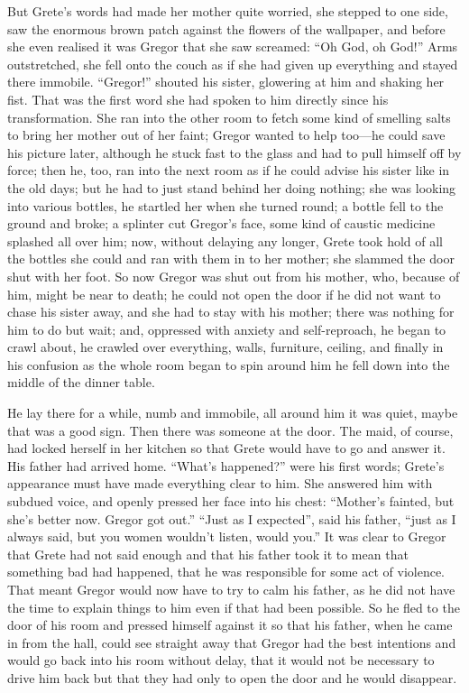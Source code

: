 But Grete’s words had made her mother quite worried, she stepped to one
side, saw the enormous brown patch against the flowers of the
wallpaper, and before she even realised it was Gregor that she saw
screamed: “Oh God, oh God!” Arms outstretched, she fell onto the couch
as if she had given up everything and stayed there immobile. “Gregor!”
shouted his sister, glowering at him and shaking her fist. That was the
first word she had spoken to him directly since his transformation. She
ran into the other room to fetch some kind of smelling salts to bring
her mother out of her faint; Gregor wanted to help too—he could save
his picture later, although he stuck fast to the glass and had to pull
himself off by force; then he, too, ran into the next room as if he
could advise his sister like in the old days; but he had to just stand
behind her doing nothing; she was looking into various bottles, he
startled her when she turned round; a bottle fell to the ground and
broke; a splinter cut Gregor’s face, some kind of caustic medicine
splashed all over him; now, without delaying any longer, Grete took
hold of all the bottles she could and ran with them in to her mother;
she slammed the door shut with her foot. So now Gregor was shut out
from his mother, who, because of him, might be near to death; he could
not open the door if he did not want to chase his sister away, and she
had to stay with his mother; there was nothing for him to do but wait;
and, oppressed with anxiety and self-reproach, he began to crawl about,
he crawled over everything, walls, furniture, ceiling, and finally in
his confusion as the whole room began to spin around him he fell down
into the middle of the dinner table.

He lay there for a while, numb and immobile, all around him it was
quiet, maybe that was a good sign. Then there was someone at the door.
The maid, of course, had locked herself in her kitchen so that Grete
would have to go and answer it. His father had arrived home. “What’s
happened?” were his first words; Grete’s appearance must have made
everything clear to him. She answered him with subdued voice, and
openly pressed her face into his chest: “Mother’s fainted, but she’s
better now. Gregor got out.” “Just as I expected”, said his father,
“just as I always said, but you women wouldn’t listen, would you.” It
was clear to Gregor that Grete had not said enough and that his father
took it to mean that something bad had happened, that he was
responsible for some act of violence. That meant Gregor would now have
to try to calm his father, as he did not have the time to explain
things to him even if that had been possible. So he fled to the door of
his room and pressed himself against it so that his father, when he
came in from the hall, could see straight away that Gregor had the best
intentions and would go back into his room without delay, that it would
not be necessary to drive him back but that they had only to open the
door and he would disappear.


